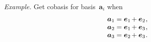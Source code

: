 \begin{otherlanguage}{russian}
\begin{tcolorbox}
\small\setlength{\abovedisplayskip}{2pt}\setlength{\belowdisplayskip}{2pt}

\emph{Example.} Get cobasis for basis~$\bm{a}_i$ when
\[ \begin{array}{l}
\bm{a}_1 = \bm{e}_1 \hspace{-0.2ex} + \bm{e}_2 \hspace{.1ex},\\
\bm{a}_2 = \bm{e}_1 \hspace{-0.2ex} + \bm{e}_3 \hspace{.1ex},\\
\bm{a}_3 = \bm{e}_2 \hspace{-0.2ex} + \bm{e}_3 \hspace{.1ex}.
\end{array} \]


\end{tcolorbox}
\end{otherlanguage}
